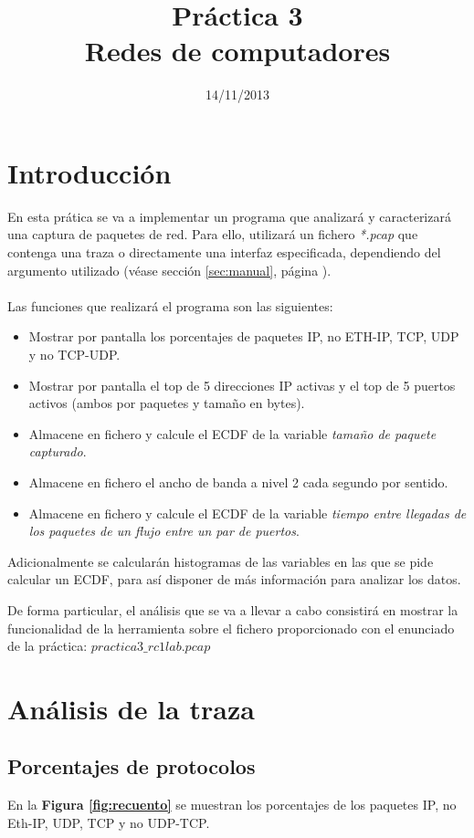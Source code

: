 \documentclass[a4paper, 11pt]{article}	%
\title{Práctica 3\\Redes de computadores}						%
\author{\enriquename \and \guillermoname}						%
\date{14/11/2013}												%
\begin{document}
\maketitle			%
\newpage				%
\tableofcontents		%
\newpage				%

\section{Introducción}	%
En esta prática se va a implementar un programa que analizará y caracterizará una captura de paquetes de red. Para ello, utilizará un fichero \textit{*.pcap} que contenga una traza o directamente una interfaz especificada, dependiendo del argumento utilizado (véase sección \ref{sec:manual}, página \pageref{sec:manual}).
\\\\
Las funciones que realizará el programa son las siguientes:
\begin{itemize}
\item Mostrar por pantalla los porcentajes de paquetes IP, no ETH-IP, TCP, UDP y no TCP-UDP.
\item Mostrar por pantalla el top de 5 direcciones IP activas y el top de 5 puertos activos  (ambos por paquetes y tamaño en bytes).
\item Almacene en fichero y calcule el ECDF de la variable \textit{tamaño de paquete capturado}.
\item Almacene en fichero el ancho de banda a nivel 2 cada segundo por sentido.
\item Almacene en fichero y calcule el ECDF de la variable \textit{tiempo entre llegadas de los paquetes de un flujo entre un par de puertos}.
\end{itemize}

Adicionalmente se calcularán histogramas de las variables en las que se pide calcular un ECDF, para así disponer de más información para analizar los datos.

De forma particular, el análisis que se va a llevar a cabo consistirá en mostrar la funcionalidad de la herramienta sobre el fichero proporcionado con el enunciado de la práctica: \textit{$practica3\_ rc1lab.pcap$}

\section{Análisis de la traza}
\subsection{Porcentajes de protocolos}
En la \textbf{Figura \ref{fig:recuento}} se muestran los porcentajes de los paquetes IP, no Eth-IP, UDP, TCP y no UDP-TCP.
\end{document}
